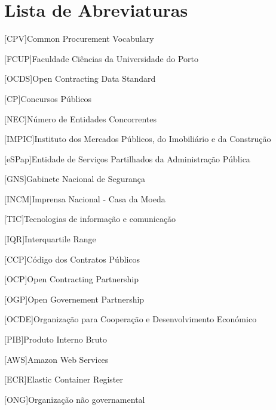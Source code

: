 \chapter*{Lista de Abreviaturas}
\label{chap:abbreviations}

\begin{multicols}{2}[]
	\begin{scriptsize}
        	\begin{acronym}
        		    [CPV]{Common Procurement Vocabulary}
        		    
        		    {Faculdade Ciências da Universidade do Porto}
                    
                    [OCDS]{Open Contracting Data Standard}
                    
                    [CP]{Concursos Públicos}
                    
                    [NEC]{Número de Entidades Concorrentes}       
                                 
                    [IMPIC]{Instituto dos Mercados Públicos, do Imobiliário e da Construção}
                    
                    [eSPap]{Entidade de Serviços Partilhados da Administração Pública}
                    
                    [GNS]{Gabinete Nacional de Segurança}
                    
                    [INCM]{Imprensa Nacional - Casa da Moeda}
                    
                    [TIC]{Tecnologias de informação e comunicação}
                    
                    [IQR]{Interquartile Range}
                                        
                    [CCP]{Código dos Contratos Públicos}
                    
                    [OCP]{Open Contracting Partnership}
                    
                    [OGP]{Open Governement Partnership }
                    
                    [OCDE]{Organização para Cooperação e Desenvolvimento Económico}
                    
                    [PIB]{Produto Interno Bruto}
                    
                    [AWS]{Amazon Web Services}
                    
                    [ECR]{Elastic Container Register}
                    
                    [ONG]{Organização não governamental}
                    
    	\end{acronym}
	\end{scriptsize}
\end{multicols}
\clearemptydoublepage
